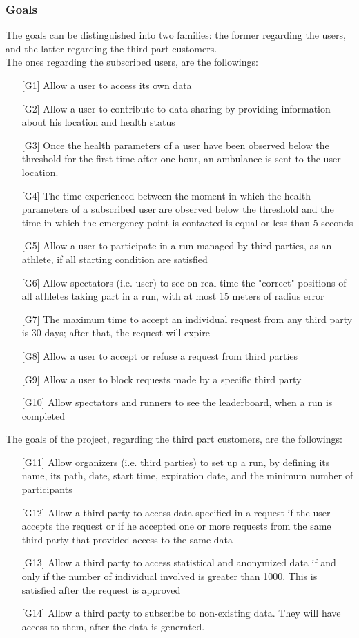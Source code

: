 \subsubsection{Goals}
The goals can be distinguished into two families: the former regarding the users, and the latter regarding the third part customers.\\
The ones regarding the subscribed users, are the followings:
\begin{enumerate}
\item[{[G1]}] Allow a user to access its own data
\item[{[G2]}] Allow a user to contribute to data sharing by providing information about his location and health status
\item[{[G3]}] Once the health parameters of a user have been observed 
below the threshold for the first time after one hour, an ambulance is sent to the user location. 
\item[{[G4]}] The time experienced between the moment in which the health parameters of a subscribed user are observed below the threshold and the time in which the emergency point is contacted is equal or less than 5 seconds
\item[{[G5]}] Allow a user to participate in a run managed by third parties, as an athlete, if all starting condition are satisfied
\item[{[G6]}] Allow spectators (i.e. user) to see on real-time the "correct" positions of all athletes taking part in a run, with at most 15 meters of radius error
\item[{[G7]}] The maximum time to accept an individual request from any third party is 30 days; after that, the request will expire
\item[{[G8]}] Allow a user to accept or refuse a request from third parties
\item[{[G9]}] Allow a user to block requests made by a specific third party
\item[{[G10]}] Allow spectators and runners to see the leaderboard, when a run is completed
\end{enumerate}
The goals of the project, regarding the third part customers, are the followings:
\begin{enumerate}
\item[{[G11]}] Allow organizers (i.e. third parties) to set up a run, by defining its name, its path, date, start time, expiration date, and the minimum number of participants
\item[{[G12]}] Allow a third party to access data specified in a request if the user accepts the request or if he accepted one or more requests from the same third party that provided access to the same data 
\item[{[G13]}] Allow a third party to access statistical and anonymized data if and only if the number of individual involved is greater than 1000. This is satisfied after the request is approved 
\item[{[G14]}] Allow a third party to subscribe to non-existing data. They will have access to them, after the data is generated. 
\end{enumerate}